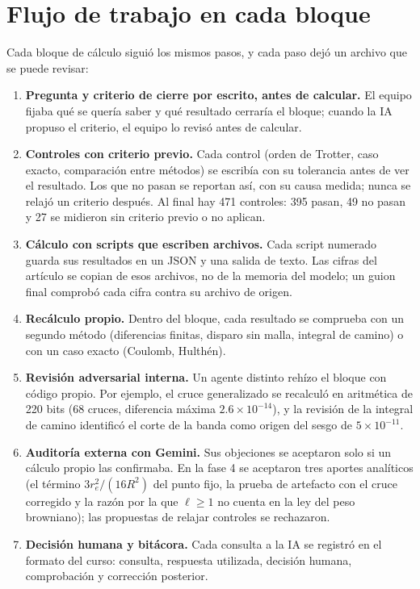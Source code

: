 \documentclass[10pt,letterpaper]{article}
\begin{document}
\section{Flujo de trabajo en cada bloque}

Cada bloque de cálculo siguió los mismos pasos, y cada paso dejó un archivo que se puede revisar:

\begin{enumerate}[leftmargin=*]
\item \textbf{Pregunta y criterio de cierre por escrito, antes de calcular.} El equipo fijaba qué se quería saber y qué resultado cerraría el bloque; cuando la IA propuso el criterio, el equipo lo revisó antes de calcular.
\item \textbf{Controles con criterio previo.} Cada control (orden de Trotter, caso exacto, comparación entre métodos) se escribía con su tolerancia antes de ver el resultado. Los que no pasan se reportan así, con su causa medida; nunca se relajó un criterio después. Al final hay 471 controles: 395 pasan, 49 no pasan y 27 se midieron sin criterio previo o no aplican.
\item \textbf{Cálculo con scripts que escriben archivos.} Cada script numerado guarda sus resultados en un JSON y una salida de texto. Las cifras del artículo se copian de esos archivos, no de la memoria del modelo; un guion final comprobó cada cifra contra su archivo de origen.
\item \textbf{Recálculo propio.} Dentro del bloque, cada resultado se comprueba con un segundo método (diferencias finitas, disparo sin malla, integral de camino) o con un caso exacto (Coulomb, Hulthén).
\item \textbf{Revisión adversarial interna.} Un agente distinto rehízo el bloque con código propio. Por ejemplo, el cruce generalizado se recalculó en aritmética de 220 bits (68 cruces, diferencia máxima $2.6\times10^{-14}$), y la revisión de la integral de camino identificó el corte de la banda como origen del sesgo de $5\times10^{-11}$.
\item \textbf{Auditoría externa con Gemini.} Sus objeciones se aceptaron solo si un cálculo propio las confirmaba. En la fase 4 se aceptaron tres aportes analíticos (el término $3r_e^2/(16R^2)$ del punto fijo, la prueba de artefacto con el cruce corregido y la razón por la que $\ell\ge1$ no cuenta en la ley del peso browniano); las propuestas de relajar controles se rechazaron.
\item \textbf{Decisión humana y bitácora.} Cada consulta a la IA se registró en el formato del curso: consulta, respuesta utilizada, decisión humana, comprobación y corrección posterior.
\end{enumerate}
\end{document}
